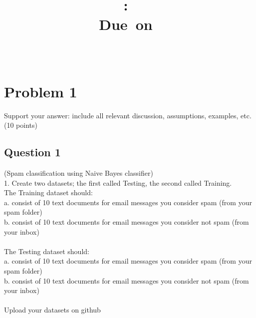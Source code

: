 \documentclass[10pt,letterpaper]{article}
\title{
\vspace{2in}
\textmd{\textbf{\hmwkClass:\ \hmwkTitle}}\\
\normalsize\vspace{0.1in}\small{Due\ on\ \hmwkDueDate}\\
\vspace{0.1in}\large{\textit{\hmwkClassInstructor\ \hmwkClassTime}}
\vspace{3in}
}
\author{\textbf{\hmwkAuthorName}}
\begin{document}
\maketitle


\pagebreak
\tableofcontents
\pagebreak 




\section{Problem 1}
Support your answer: include all relevant discussion, assumptions, examples, etc.(10 points)
\\
\subsection{Question 1}
(Spam classification using Naive Bayes classifier)\\
1. Create two datasets; the first called Testing, the second called Training. \\
	The Training dataset should:\\
		a. consist of 10 text documents for email messages you consider spam (from your spam folder)\\
		b. consist of 10 text documents for email messages you consider not spam (from your inbox)\\
\\
	The Testing dataset should:\\
		a. consist of 10 text documents for email messages you consider spam (from your spam folder)\\
		b. consist of 10 text documents for email messages you consider not spam (from your inbox)\\
\\
	Upload your datasets on github\\
\\
\end{document}
